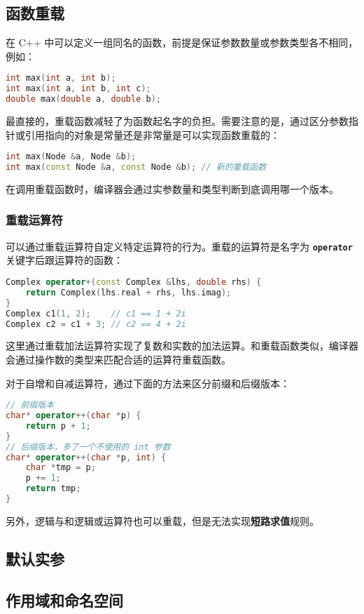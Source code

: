 \documentclass[hyperref,UTF8]{article}
\begin{document}
\subsection{函数重载}

在 C++ 中可以定义一组同名的函数，前提是保证参数数量或参数类型各不相同，例如：
\begin{lstlisting}[language=c++]
int max(int a, int b);
int max(int a, int b, int c);
double max(double a, double b);
\end{lstlisting}
最直接的，重载函数减轻了为函数起名字的负担。需要注意的是，通过区分参数指针或引用指向的对象是常量还是非常量是可以实现函数重载的：
\begin{lstlisting}[language=c++]
int max(Node &a, Node &b);
int max(const Node &a, const Node &b); // 新的重载函数
\end{lstlisting}

在调用重载函数时，编译器会通过实参数量和类型判断到底调用哪一个版本。

\subsubsection{重载运算符} \label{sec:overloaded_operator}

可以通过重载运算符自定义特定运算符的行为。重载的运算符是名字为 \textbf{\texttt{operator}} 关键字后跟运算符的函数：
\begin{lstlisting}[language=c++]
Complex operator+(const Complex &lhs, double rhs) {
    return Complex(lhs.real + rhs, lhs.imag);
}
Complex c1(1, 2);    // c1 == 1 + 2i
Complex c2 = c1 + 3; // c2 == 4 + 2i
\end{lstlisting}
这里通过重载加法运算符实现了复数和实数的加法运算。和重载函数类似，编译器会通过操作数的类型来匹配合适的运算符重载函数。

对于自增和自减运算符，通过下面的方法来区分前缀和后缀版本：
\begin{lstlisting}[language=c++]
// 前缀版本
char* operator++(char *p) {
    return p + 1;
}
// 后缀版本，多了一个不使用的 int 参数
char* operator++(char *p, int) {
    char *tmp = p;
    p += 1;
    return tmp;
}
\end{lstlisting}
另外，逻辑与和逻辑或运算符也可以重载，但是无法实现\textbf{短路求值}规则。

\subsection{默认实参}

\subsection{作用域和命名空间} \label{sec:scope}
\end{document}
